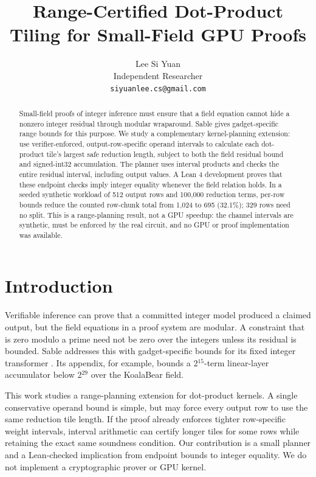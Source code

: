\documentclass[11pt]{article}
\title{Range-Certified Dot-Product Tiling for Small-Field GPU Proofs}
\author{Lee Si Yuan \\
  Independent Researcher \\
  \texttt{siyuanlee.cs@gmail.com}}
\begin{document}
\maketitle
\begin{abstract}
Small-field proofs of integer inference must ensure that a field equation cannot hide a nonzero integer residual through modular wraparound. Sable gives gadget-specific range bounds for this purpose. We study a complementary kernel-planning extension: use verifier-enforced, output-row-specific operand intervals to calculate each dot-product tile's largest safe reduction length, subject to both the field residual bound and signed-int32 accumulation. The planner uses interval products and checks the entire residual interval, including output values. A Lean 4 development proves that these endpoint checks imply integer equality whenever the field relation holds. In a seeded synthetic workload of 512 output rows and 100,000 reduction terms, per-row bounds reduce the counted row-chunk total from 1,024 to 695 (32.1\%); 329 rows need no split. This is a range-planning result, not a GPU speedup: the channel intervals are synthetic, must be enforced by the real circuit, and no GPU or proof implementation was available.
\end{abstract}

\section{Introduction}
Verifiable inference can prove that a committed integer model produced a claimed output, but the field equations in a proof system are modular. A constraint that is zero modulo a prime need not be zero over the integers unless its residual is bounded. Sable addresses this with gadget-specific bounds for its fixed integer transformer \citep{solberg2026sable}. Its appendix, for example, bounds a 2$^{15}$-term linear-layer accumulator below 2$^{29}$ over the KoalaBear field.

This work studies a range-planning extension for dot-product kernels. A single conservative operand bound is simple, but may force every output row to use the same reduction tile length. If the proof already enforces tighter row-specific weight intervals, interval arithmetic can certify longer tiles for some rows while retaining the exact same soundness condition. Our contribution is a small planner and a Lean-checked implication from endpoint bounds to integer equality. We do not implement a cryptographic prover or GPU kernel.
\end{document}
